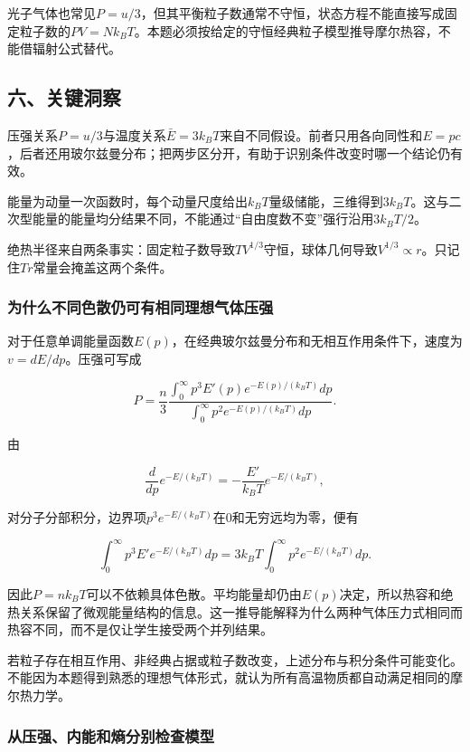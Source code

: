 \documentclass[12pt,a4paper,fontset=fandol]{ctexart}
\begin{document}
光子气体也常见\(P=u/3\)，但其平衡粒子数通常不守恒，状态方程不能直接写成固定粒子数的\(PV=Nk_BT\)。本题必须按给定的守恒经典粒子模型推导摩尔热容，不能借辐射公式替代。

\subsection{六、关键洞察}\label{ux516dux5173ux952eux6d1eux5bdf-6}

压强关系\(P=u/3\)与温度关系\(\bar E=3k_BT\)来自不同假设。前者只用各向同性和\(E=pc\)，后者还用玻尔兹曼分布；把两步区分开，有助于识别条件改变时哪一个结论仍有效。

能量为动量一次函数时，每个动量尺度给出\(k_BT\)量级储能，三维得到\(3k_BT\)。这与二次型能量的能量均分结果不同，不能通过``自由度数不变''强行沿用\(3k_BT/2\)。

绝热半径来自两条事实：固定粒子数导致\(TV^{1/3}\)守恒，球体几何导致\(V^{1/3}\propto r\)。只记住\(Tr\)常量会掩盖这两个条件。

\subsubsection{为什么不同色散仍可有相同理想气体压强}\label{ux4e3aux4ec0ux4e48ux4e0dux540cux8272ux6563ux4ecdux53efux6709ux76f8ux540cux7406ux60f3ux6c14ux4f53ux538bux5f3a}

对于任意单调能量函数\(E(p)\)，在经典玻尔兹曼分布和无相互作用条件下，速度为\(v=dE/dp\)。压强可写成

\[
P=\frac n3
\frac{\int_0^\infty p^3E'(p)e^{-E(p)/(k_BT)}dp}
{\int_0^\infty p^2e^{-E(p)/(k_BT)}dp}.
\]

由

\[
\frac d{dp}e^{-E/(k_BT)}
=-\frac{E'}{k_BT}e^{-E/(k_BT)},
\]

对分子分部积分，边界项\(p^3e^{-E/(k_BT)}\)在0和无穷远均为零，便有

\[
\int_0^\infty p^3E'e^{-E/(k_BT)}dp
=3k_BT\int_0^\infty p^2e^{-E/(k_BT)}dp.
\]

因此\(P=nk_BT\)可以不依赖具体色散。平均能量却仍由\(E(p)\)决定，所以热容和绝热关系保留了微观能量结构的信息。这一推导能解释为什么两种气体压力式相同而热容不同，而不是仅让学生接受两个并列结果。

若粒子存在相互作用、非经典占据或粒子数改变，上述分布与积分条件可能变化。不能因为本题得到熟悉的理想气体形式，就认为所有高温物质都自动满足相同的摩尔热力学。

\subsubsection{从压强、内能和熵分别检查模型}\label{ux4eceux538bux5f3aux5185ux80fdux548cux71b5ux5206ux522bux68c0ux67e5ux6a21ux578b}
\end{document}
